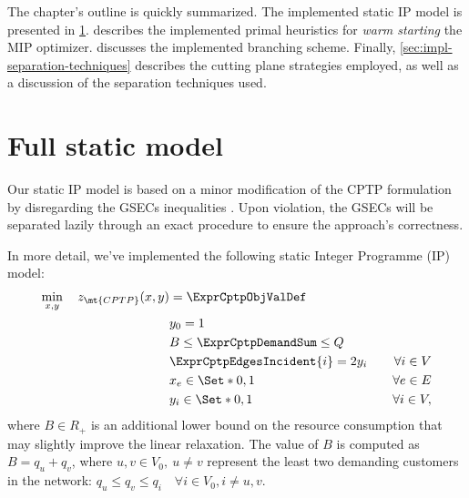 \medskip

The chapter's outline is quickly summarized.
The implemented static IP model is presented in \cref{sec:impl-full-static-model}.
 describes the implemented primal heuristics
for \textit{warm starting} the MIP optimizer.
 discusses the implemented branching scheme.
Finally, \cref{sec:impl-separation-techniques} describes the cutting plane strategies employed,
as well as a discussion of the separation techniques used.

\section{Full static model}
\label{sec:impl-full-static-model}

Our static IP model is based on a minor modification of the CPTP formulation
by disregarding the GSECs inequalities .
Upon violation,
the GSECs will be separated lazily through an exact procedure to ensure the approach's correctness.

In more detail, we've implemented the following static Integer Programme (IP) model:
\begin{align}
	\min_{x,y} \quad z_\mt{CPTP}(x, y) & = \ExprCptpObjValDef                     & \label{eq:cptp-static-model-0}                         \\
	                                   & y_0 = 1                                  & \label{eq:cptp-static-model-1}                         \\
	                                   & B \le   \ExprCptpDemandSum   \le Q       & \label{eq:cptp-static-model-2}                         \\
	                                   & \ExprCptpEdgesIncident{i}    = 2 y_i     & \quad \forall i \in V  \label{eq:cptp-static-model-3}  \\
	                                   & x_{e}                   \in \Set*{0, 1}  & \quad \forall e \in E  \label{eq:cptp-static-model-4}  \\
	                                   & y_{i}                    \in \Set*{0, 1} & \quad \forall i \in V  \label{eq:cptp-static-model-5},
\end{align}
where
$B \in R_+$ is an additional lower bound on the resource consumption
that may slightly improve the linear relaxation.
The value of $B$ is computed as $B = q_u + q_v$, where $u, v \in V_0,\ u \ne v$
represent the least two demanding customers in the network:
$q_u \le q_v \le q_i \quad \forall i \in V_0, i \ne u, v$.

